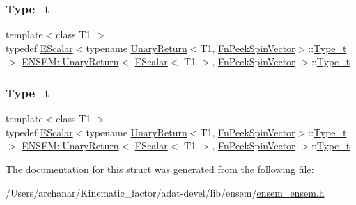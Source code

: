 \subsubsection{\texorpdfstring{Type\_t}{Type\_t}\hspace{0.1cm}{\footnotesize\ttfamily [2/3]}}
{\footnotesize\ttfamily template$<$class T1 $>$ \\
typedef \mbox{\hyperlink{classENSEM_1_1EScalar}{E\+Scalar}}$<$typename \mbox{\hyperlink{structENSEM_1_1UnaryReturn}{Unary\+Return}}$<$T1, \mbox{\hyperlink{structENSEM_1_1FnPeekSpinVector}{Fn\+Peek\+Spin\+Vector}}$>$\+::\mbox{\hyperlink{structENSEM_1_1UnaryReturn_3_01EScalar_3_01T1_01_4_00_01FnPeekSpinVector_01_4_ab36dc210813249d571d0447c7da504ac}{Type\+\_\+t}}$>$ \mbox{\hyperlink{structENSEM_1_1UnaryReturn}{E\+N\+S\+E\+M\+::\+Unary\+Return}}$<$ \mbox{\hyperlink{classENSEM_1_1EScalar}{E\+Scalar}}$<$ T1 $>$, \mbox{\hyperlink{structENSEM_1_1FnPeekSpinVector}{Fn\+Peek\+Spin\+Vector}} $>$\+::\mbox{\hyperlink{structENSEM_1_1UnaryReturn_3_01EScalar_3_01T1_01_4_00_01FnPeekSpinVector_01_4_ab36dc210813249d571d0447c7da504ac}{Type\+\_\+t}}}

\mbox{\label{structENSEM_1_1UnaryReturn_3_01EScalar_3_01T1_01_4_00_01FnPeekSpinVector_01_4_ab36dc210813249d571d0447c7da504ac}} 
\subsubsection{\texorpdfstring{Type\_t}{Type\_t}\hspace{0.1cm}{\footnotesize\ttfamily [3/3]}}
{\footnotesize\ttfamily template$<$class T1 $>$ \\
typedef \mbox{\hyperlink{classENSEM_1_1EScalar}{E\+Scalar}}$<$typename \mbox{\hyperlink{structENSEM_1_1UnaryReturn}{Unary\+Return}}$<$T1, \mbox{\hyperlink{structENSEM_1_1FnPeekSpinVector}{Fn\+Peek\+Spin\+Vector}}$>$\+::\mbox{\hyperlink{structENSEM_1_1UnaryReturn_3_01EScalar_3_01T1_01_4_00_01FnPeekSpinVector_01_4_ab36dc210813249d571d0447c7da504ac}{Type\+\_\+t}}$>$ \mbox{\hyperlink{structENSEM_1_1UnaryReturn}{E\+N\+S\+E\+M\+::\+Unary\+Return}}$<$ \mbox{\hyperlink{classENSEM_1_1EScalar}{E\+Scalar}}$<$ T1 $>$, \mbox{\hyperlink{structENSEM_1_1FnPeekSpinVector}{Fn\+Peek\+Spin\+Vector}} $>$\+::\mbox{\hyperlink{structENSEM_1_1UnaryReturn_3_01EScalar_3_01T1_01_4_00_01FnPeekSpinVector_01_4_ab36dc210813249d571d0447c7da504ac}{Type\+\_\+t}}}



The documentation for this struct was generated from the following file\+:\begin{DoxyCompactItemize}
\item 
/\+Users/archanar/\+Kinematic\+\_\+factor/adat-\/devel/lib/ensem/\mbox{\hyperlink{adat-devel_2lib_2ensem_2ensem__ensem_8h}{ensem\+\_\+ensem.\+h}}\end{DoxyCompactItemize}
